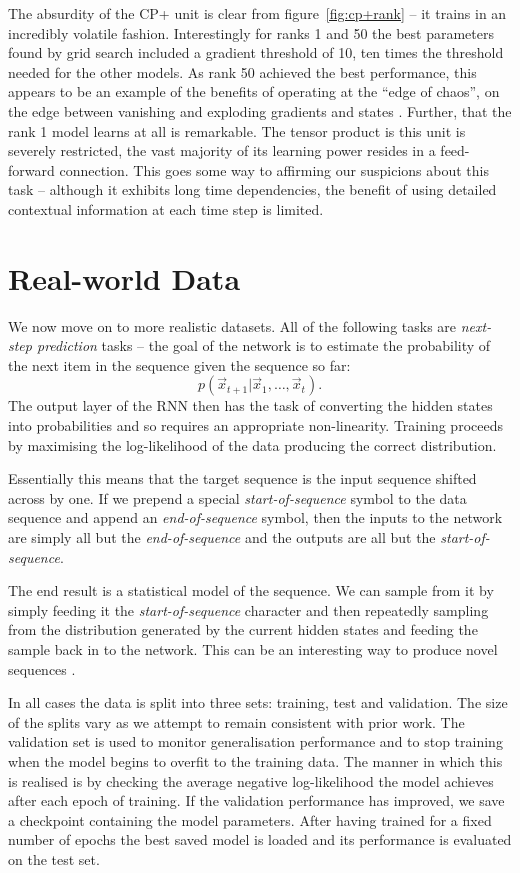 The absurdity of the CP+ unit is clear from figure~\ref{fig:cp+rank} --
it trains in an incredibly volatile fashion. Interestingly for ranks
1 and 50 the best parameters found by grid search included a gradient
threshold of 10, ten times the threshold needed for the other models.
As rank 50 achieved the best performance, this appears to be an
example of the benefits of operating at the ``edge of chaos'',
on the edge between vanishing and exploding gradients and states
\autocite{Bertschinger2004}. Further, that the rank 1 model learns
at all is remarkable. The tensor product is this unit is severely
restricted, the vast majority of its learning power resides in a
feed-forward connection. This goes some way to affirming our suspicions
about this task -- although  it exhibits long time dependencies, the
benefit of using detailed contextual information at each time step is
limited.

\section{Real-world Data}
We now move on to more realistic datasets. All of the following tasks are
\emph{next-step prediction} tasks -- the goal of the network is to estimate
the probability of the next item in the sequence given the sequence so far:
\begin{equation} \label{eq:seqprob}
	p(\vec{x}_{t+1} | \vec{x}_{1},\ldots,\vec{x}_{t}).
\end{equation} The output layer of the RNN then has the task of converting
the hidden states into probabilities and so requires an appropriate non-linearity.
Training proceeds by maximising the log-likelihood of the data producing the
correct distribution.

Essentially this means that the target sequence is the input
sequence shifted across by one. If we prepend a special \emph{start-of-sequence}
symbol to the data sequence and append an \emph{end-of-sequence} symbol,
then the inputs to the network are simply all but the \emph{end-of-sequence}
and the outputs are all but the \emph{start-of-sequence}.

The end result is a statistical model of the sequence. We can sample from it
by simply feeding it the \emph{start-of-sequence} character and then repeatedly
sampling from the distribution generated by the current hidden states and
feeding the sample back in to the network. This can be an interesting way to
produce novel sequences \autocite{Graves2013}.

In all cases the data is split into three sets: training, test and validation.
The size of the splits vary as we attempt to remain consistent with prior work.
The validation set is used to monitor generalisation performance and to stop
training when the model begins to overfit to the training data. The manner in
which this is realised is by checking the average negative log-likelihood the model
achieves after each epoch of training. If the validation performance has improved,
we save a checkpoint containing the model parameters. After having trained for
a fixed number of epochs the best saved model is loaded and its performance is
evaluated on the test set.

